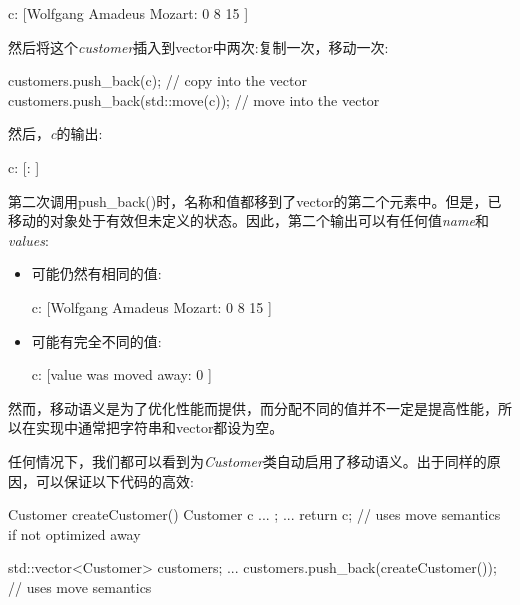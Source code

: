 \begin{myOutput}
c: [Wolfgang Amadeus Mozart: 0 8 15 ]
\end{myOutput}

然后将这个\textit{customer}插入到vector中两次:复制一次，移动一次:\par

\begin{codebox}[cpp]
customers.push_back(c); // copy into the vector
customers.push_back(std::move(c)); // move into the vector
\end{codebox}

然后，\textit{c}的输出:\par

\begin{myOutput}
c: [: ]
\end{myOutput}

第二次调用push\_back()时，名称和值都移到了vector的第二个元素中。但是，已移动的对象处于有效但未定义的状态。因此，第二个输出可以有任何值\textit{name}和\textit{values}:\par

\begin{itemize}
  \item 可能仍然有相同的值:\par
  \begin{myOutput}
  c: [Wolfgang Amadeus Mozart: 0 8 15 ]
  \end{myOutput}
  \item 可能有完全不同的值:\par
  \begin{myOutput}
  c: [value was moved away: 0 ]
  \end{myOutput}
\end{itemize}

然而，移动语义是为了优化性能而提供，而分配不同的值并不一定是提高性能，所以在实现中通常把字符串和vector都设为空。\par

任何情况下，我们都可以看到为\textit{Customer}类自动启用了移动语义。出于同样的原因，可以保证以下代码的高效:\par

\begin{codebox}[cpp]
Customer createCustomer()
{
  Customer c{ ... };
  ...
  return c; // uses move semantics if not optimized away
}

std::vector<Customer> customers;
...
customers.push_back(createCustomer()); // uses move semantics
\end{codebox}

